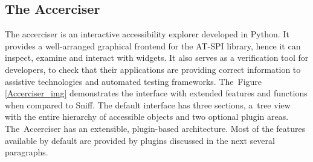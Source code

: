 \subsection{The Accerciser}
The accerciser is an interactive accessibility explorer developed in Python. It provides a well-arranged graphical frontend for the AT-SPI library, hence it can inspect, examine and interact with widgets. It also serves as a verification tool for developers, to check that their applications are providing correct information to assistive technologies and automated testing frameworks. The~Figure \ref{Accerciser_img} demonstrates the interface with extended features and functions when compared to Sniff. The default interface has three sections, a~tree view with the entire hierarchy of accessible objects and two optional plugin areas. The~Accerciser has an extensible, plugin-based architecture. Most of the features available by default are provided by plugins discussed in the next several paragraphs.

